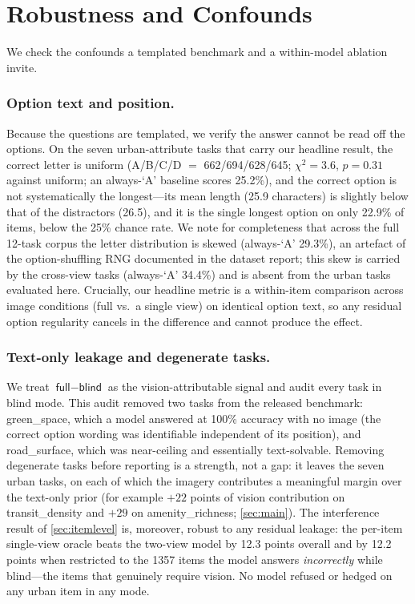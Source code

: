 \section{Robustness and Confounds}
\label{sec:robustness}

We check the confounds a templated benchmark and a within-model ablation invite.

\subsubsection{Option text and position.}
Because the questions are templated, we verify the answer cannot be read off the
options. On the seven urban-attribute tasks that carry our headline result, the
correct letter is uniform (A/B/C/D $=$ \num{662}/\num{694}/\num{628}/\num{645};
$\chi^2=\num{3.6}$, $p=\num{0.31}$ against uniform; an always-`A' baseline scores
\num{25.2}\%), and the correct option is not systematically the longest---its mean
length (\num{25.9} characters) is slightly below that of the distractors
(\num{26.5}), and it is the single longest option on only \num{22.9}\% of items,
below the \num{25}\% chance rate. We note for completeness that across the full
\num{12}-task corpus the letter distribution is skewed (always-`A' \num{29.3}\%),
an artefact of the option-shuffling RNG documented in the dataset report; this skew
is carried by the cross-view tasks (always-`A' \num{34.4}\%) and is absent from the
urban tasks evaluated here. Crucially, our headline metric is a within-item
comparison across image conditions (\textsf{full} vs.\ a single view) on identical
option text, so any residual option regularity cancels in the difference and cannot
produce the effect.

\subsubsection{Text-only leakage and degenerate tasks.}
We treat $\textsf{full}-\textsf{blind}$ as the vision-attributable signal and audit
every task in \textsf{blind} mode. This audit removed two tasks from the released
benchmark: \textsf{green\_space}, which a model answered at \num{100}\% accuracy with
no image (the correct option wording was identifiable independent of its position),
and \textsf{road\_surface}, which was near-ceiling and essentially text-solvable.
Removing degenerate tasks before reporting is a strength, not a gap: it leaves the
seven urban tasks, on each of which the imagery contributes a meaningful margin over
the text-only prior (for example $+\num{22}$ points of vision contribution on
\textsf{transit\_density} and $+\num{29}$ on \textsf{amenity\_richness};
\cref{sec:main}). The interference result of \cref{sec:itemlevel} is, moreover,
robust to any residual leakage: the per-item single-view oracle beats the two-view
model by \num{12.3} points overall and by \num{12.2} points when restricted to the
\num{1357} items the model answers \emph{incorrectly} while blind---the items that
genuinely require vision. No model refused or hedged on any urban item in any mode.

